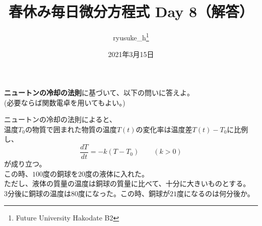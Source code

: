 \documentclass[a4j]{jsarticle}
\title{春休み毎日微分方程式 Day 8（解答）}
\author{ryusuke\_h\thanks{Future University Hakodate B2}}
\date{2021年3月15日}
\begin{document}
\begin{spacing}{1.6}
\maketitle

{\bf ニュートンの冷却の法則}に基づいて、以下の問いに答えよ。\\
(必要ならば関数電卓を用いてもよい。)
\begin{qparts}
  \qpart
  ニュートンの冷却の法則によると、\\
  温度$T_0$の物質で囲まれた物質の温度$T(t)$の変化率は温度差$T(t) - T_0$に比例し、
  \begin{equation}
    \frac{dT}{dt} = -k(T - T_0) \qquad (k > 0)\nonumber
  \end{equation}
  が成り立つ。\\
  この時、$100$度の銅球を$20$度の液体に入れた。\\
  ただし、液体の質量の温度は銅球の質量に比べて、十分に大きいものとする。\\
  $3$分後に銅球の温度は$80$度になった。この時、銅球が$21$度になるのは何分後か。\\


\end{qparts}
\end{spacing}
\end{document}
